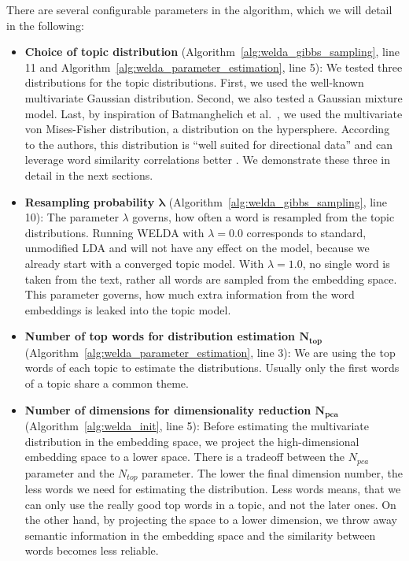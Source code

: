 \documentclass[
        a4paper,
        titlepage,
        twoside,
        parskip,
        numbers=noenddot
        ]{scrbook}
\theoremstyle{break}
\begin{document}
There are several configurable parameters in the algorithm, which we will detail in the following:
\begin{itemize}
  \item \textbf{Choice of topic distribution} (Algorithm~\ref{alg:welda_gibbs_sampling}, line 11 and Algorithm~\ref{alg:welda_parameter_estimation}, line 5):
    We tested three distributions for the topic distributions.
    First, we used the well-known multivariate Gaussian distribution.
    Second, we also tested a Gaussian mixture model.
    Last, by inspiration of Batmanghelich et al.\ \cite{Batmanghelich2016}, we used the multivariate von Mises-Fisher distribution, a distribution on the hypersphere.
    According to the authors, this distribution is ``well suited for directional data'' and can leverage word similarity correlations better \cite{Batmanghelich2016}.
    We demonstrate these three in detail in the next sections.
  \item \textbf{Resampling probability $\boldsymbol{\lambda}$} (Algorithm~\ref{alg:welda_gibbs_sampling}, line 10):
    The parameter $\lambda$ governs, how often a word is resampled from the topic distributions.
    Running WELDA with $\lambda = 0.0$ corresponds to standard, unmodified LDA and will not have any effect on the model, because we already start with a converged topic model.
    With $\lambda = 1.0$, no single word is taken from the text, rather all words are sampled from the embedding space.
    This parameter governs, how much extra information from the word embeddings is leaked into the topic model.
  \item \textbf{Number of top words for distribution estimation $\boldsymbol{N_{top}}$} (Algorithm~\ref{alg:welda_parameter_estimation}, line 3):
    We are using the top words of each topic to estimate the distributions.
    Usually only the first words of a topic share a common theme.
  \item \textbf{Number of dimensions for dimensionality reduction $\boldsymbol{N_{pca}}$} (Algorithm~\ref{alg:welda_init}, line 5):
    Before estimating the multivariate distribution in the embedding space, we project the high-dimensional embedding space to a lower space.
    There is a tradeoff between the $N_{pca}$ parameter and the $N_{top}$ parameter.
    The lower the final dimension number, the less words we need for estimating the distribution.
    Less words means, that we can only use the really good top words in a topic, and not the later ones.
    On the other hand, by projecting the space to a lower dimension, we throw away semantic information in the embedding space and the similarity between words becomes less reliable.

\end{itemize}
\end{document}

